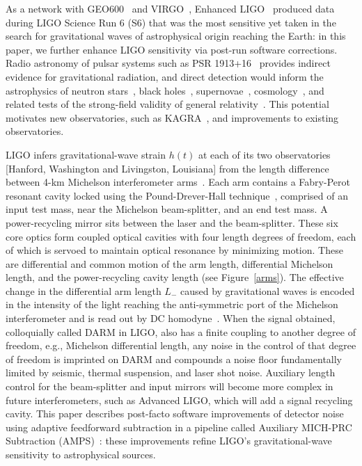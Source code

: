 	As a network with GEO600~\cite{Willke2002,Hild2009} and VIRGO~\cite{Acernese2005}, Enhanced LIGO~\cite{LIGOFirst2004,Fricke2009} produced data during LIGO Science Run 6 (S6) that was the most sensitive yet taken in the search for gravitational waves of astrophysical origin reaching the Earth: in this paper, we further enhance LIGO sensitivity via post-run software corrections. Radio astronomy of pulsar systems such as PSR 1913+16~\cite{HulseTaylor1975} provides indirect evidence for gravitational radiation, and direct detection would inform the astrophysics of neutron stars~\cite{Lindblom1995,AbbottPulsar2006}, black holes~\cite{Sathyaprakash2009}, supernovae~\cite{Chandrasekhar1969,Ott2009}, cosmology~\cite{Grishchuk1974}, and related tests of the strong-field validity of general relativity~\cite{Riles2013}. This potential motivates new observatories, such as KAGRA~\cite{Kuroda2010}, and improvements to existing observatories. 

LIGO infers gravitational-wave strain $h(t)$ at each of its two observatories [Hanford, Washington and Livingston, Louisiana] from the length difference between 4-km Michelson interferometer arms~\cite{Saulson}. Each arm contains a Fabry-Perot resonant cavity locked using the Pound-Drever-Hall technique~\cite{Black2001}, comprised of an input test mass, near the Michelson beam-splitter, and an end test mass. A power-recycling mirror sits between the laser and the beam-splitter. These six core optics form coupled optical cavities with four length degrees of freedom, each of which is servoed to maintain optical resonance by minimizing motion. These are differential and common motion of the arm length, differential Michelson length, and the power-recycling cavity length (see Figure~\ref{arms}). The effective change in the differential arm length $L_-$ caused by gravitational waves is encoded in the intensity of the light reaching the anti-symmetric port of the Michelson interferometer and is read out by DC homodyne~\cite{Fricke2009}. When the signal obtained, colloquially called DARM in LIGO, also has a finite coupling to another degree of freedom, e.g., Michelson differential length, any noise in the control of that degree of freedom is imprinted on DARM and compounds a noise floor fundamentally limited by seismic, thermal suspension, and laser shot noise. Auxiliary length control for the beam-splitter and input mirrors will become more complex in future interferometers, such as Advanced LIGO, which will add a signal recycling cavity. This paper describes post-facto software improvements of detector noise using adaptive feedforward subtraction in a pipeline called Auxiliary MICH-PRC Subtraction (AMPS)~\cite{MatappsRepository}: these improvements refine LIGO's gravitational-wave sensitivity to astrophysical sources.

